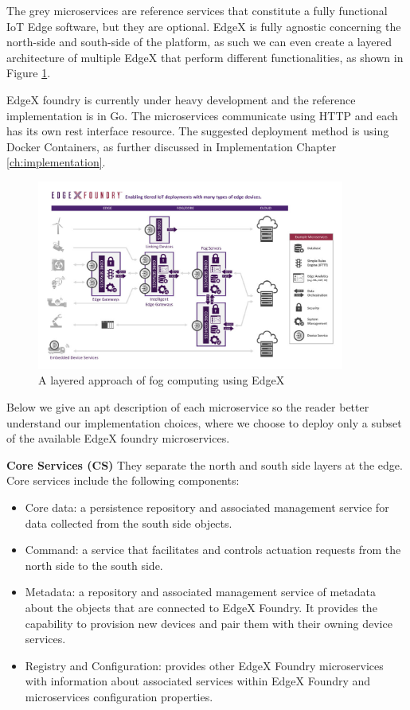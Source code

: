 The grey microservices are reference services that constitute a fully functional IoT Edge software, but they are optional. EdgeX is fully agnostic concerning the \gls{north-side} and \gls{south-side} of the platform, as such we can even create a layered architecture of multiple EdgeX that perform different functionalities, as shown in Figure \ref{fig:edgex_fog_layer}.

EdgeX foundry is currently under heavy development and the reference implementation is in Go. The microservices communicate using HTTP and each has its own \acrfull{rest} interface resource. The suggested deployment method is using Docker Containers, as further discussed in Implementation Chapter \ref{ch:implementation}.

\begin{figure}[h]
    \centering
    \includegraphics[width=0.9\textwidth]{images/edgex_fog_layer.jpg}
    \caption{A layered approach of fog computing using EdgeX}
    \label{fig:edgex_fog_layer}
\end{figure}

Below we give an apt description of each microservice so the reader better understand our implementation choices, where we choose to deploy only a subset of the available EdgeX foundry microservices.
 
\textbf{Core Services (CS)}
They separate the north and south side layers at the edge. Core services include the following components:
\begin{itemize}
    \item Core data: a persistence repository and associated management service for data collected from the south side objects.
    \item Command: a service that facilitates and controls actuation requests from the north side to the south side.
    \item Metadata: a repository and associated management service of metadata about the objects that are connected to EdgeX Foundry. It provides the capability to provision new devices and pair them with their owning device services.
    \item Registry and Configuration: provides other EdgeX Foundry microservices with information about associated services within EdgeX Foundry and microservices configuration properties. 
\end{itemize}

